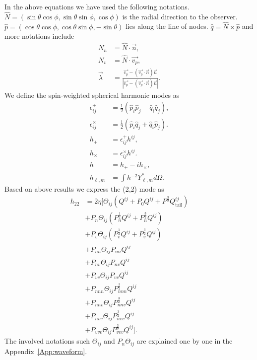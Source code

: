 \documentclass[prd,aps,a4paper,superscriptaddress,twocolumn,footinbib,showpacs]{revtex4}
\begin{document}
In the above equations we have used the following notations. $\hat{N}=(\sin\theta\cos\phi,\sin\theta\sin\phi,\cos\phi)$ is the radial direction to the observer. $\hat{p}=(\cos\theta\cos\phi,\cos\theta\sin\phi,-\sin\theta)$ lies along the line of nodes. $\hat{q}=\hat{N}\times\hat{p}$ and more notations include \cite{PhysRevD.54.4813,PhysRevD.52.821}
\begin{align}
N_n&=\hat{N}\cdot \vec{n},\\
N_v&=\hat{N}\cdot\vec{v_p},\\
\vec{\lambda}&=\frac{\vec{v_p}-(\vec{v_p}\cdot\vec{n})\vec{n}}
{|\vec{v_p}-(\vec{v_p}\cdot\vec{n})\vec{n}|}.
\end{align}
We define the spin-weighted spherical harmonic modes as
\begin{align}
\epsilon^+_{ij}&=\frac{1}{2}(\hat{p}_i\hat{p}_j-\hat{q}_i\hat{q}_j),\\
\epsilon^\times_{ij}&=\frac{1}{2}(\hat{p}_i\hat{q}_j+\hat{q}_i\hat{p}_j).\\
h_+&=\epsilon^+_{ij}h^{ij},\\
h_\times&=\epsilon^\times_{ij}h^{ij}.\\
h&=h_+-ih_\times,\\
h_{\ell,m}&=\int h {}^{-2}Y^*_{\ell,m}d\Omega.\label{ewavee}
\end{align}
Based on above results we express the (2,2) mode as
\begin{align}
h_{22}&=2\eta[\Theta_{ij}(Q^{ij}+P_0Q^{ij}+P^{\frac{3}{2}}Q^{ij}_{\text{tail}})\nonumber\\
&+P_n\Theta_{ij}(P_n^{\frac{1}{2}}Q^{ij}+P^{\frac{3}{2}}_nQ^{ij})\nonumber\\
&+P_v\Theta_{ij}(P_v^{\frac{1}{2}}Q^{ij}+P^{\frac{3}{2}}_vQ^{ij})\nonumber\\
&+P_{nn}\Theta_{ij}P_{nn}Q^{ij}\nonumber\\
&+P_{nv}\Theta_{ij}P_{nv}Q^{ij}\nonumber\\
&+P_{vv}\Theta_{ij}P_{vv}Q^{ij}\nonumber\\
&+P_{nnn}\Theta_{ij}P^{\frac{3}{2}}_{nnn}Q^{ij}\nonumber\\
&+P_{nnv}\Theta_{ij}P^{\frac{3}{2}}_{nnv}Q^{ij}\nonumber\\
&+P_{nvv}\Theta_{ij}P^{\frac{3}{2}}_{nvv}Q^{ij}\nonumber\\
&+P_{vvv}\Theta_{ij}P^{\frac{3}{2}}_{vvv}Q^{ij}].\label{h22will}
\end{align}
The involved notations such $\Theta_{ij}$ and $P_n\Theta_{ij}$ are explained one by one in the Appendix~\ref{App:waveform}.
\end{document}
